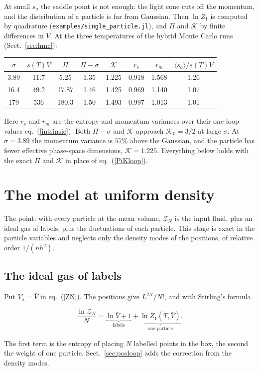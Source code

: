 \documentclass[11pt,aps,preprint,nofootinbib,superscriptaddress,tightenlines]{revtex4-2}
\newcommand{\avg}[1]{\langle #1\rangle}
\def\st{\begin{equation}}
\def\stp{\end{equation}}
\def\Eq#1{eq.~(\ref{#1})}
\def\Sect#1{Sect.~\ref{#1}}
\begin{document}
At small $s_a$ the saddle point is not enough: the light cone cuts off the momentum, and the distribution of a particle is far from Gaussian.  Then
$\ln Z_1$ is computed by quadrature (\texttt{examples/single\_particle.jl}), and $\Pi$ and $\mathcal K$ by finite differences in $V$.  At the three
temperatures of the hybrid Monte Carlo runs (\Sect{sec:hmc}):
\begin{center}
\begin{tabular}{cccccccc}
\toprule
$\sigma$ & $s(T)\bar V$ & $\Pi$ & $\Pi-\sigma$ & $\mathcal K$ & $r_s$ & $r_m$ & $\avg{s_a}/s(T)\bar V$ \\
\midrule
3.89 & 11.7 & 5.25 & 1.35 & 1.225 & 0.918 & 1.568 & 1.26 \\
16.4 & 49.2 & 17.87 & 1.46 & 1.425 & 0.969 & 1.140 & 1.07 \\
179 & 536 & 180.3 & 1.50 & 1.493 & 0.997 & 1.013 & 1.01 \\
\bottomrule
\end{tabular}
\end{center}
Here $r_s$ and $r_m$ are the entropy and momentum variances over their one-loop values \Eq{intrinsic}.  Both $\Pi-\sigma$ and $\mathcal K$ approach
$\mathcal K_0=3/2$ at large $\sigma$.  At $\sigma=3.89$ the momentum variance is $57\%$ above the Gaussian, and the particle has fewer effective
phase-space dimensions, $\mathcal K=1.225$.  Everything below holds with the exact $\Pi$ and $\mathcal K$ in place of \Eq{PiKloop}.

\section{The model at uniform density}
\label{sec:uniform}

The point: with every particle at the mean volume, $\mathcal Z_N$ is the input fluid, plus an ideal gas of labels, plus the fluctuations of each
particle.  This stage is exact in the particle variables and neglects only the density modes of the positions, of relative order $1/(\bar nh^2)$.

\subsection{The ideal gas of labels}
\label{sec:labelgas}

Put $V_a=\bar V$ in \Eq{ZN}.  The positions give $L^{2N}/N!$, and with Stirling's formula
\begin{keyeq}
\st
\frac{\ln\mathcal Z_N}N=\underbrace{\ln\bar V+1}_{\text{labels}}+\underbrace{\ln Z_1(T,\bar V)}_{\text{one particle}} .
\label{lnZuniform}
\stp
\end{keyeq}
The first term is the entropy of placing $N$ labelled points in the box, the second the weight of one particle.  \Sect{sec:posloop} adds the
correction from the density modes.
\end{document}
